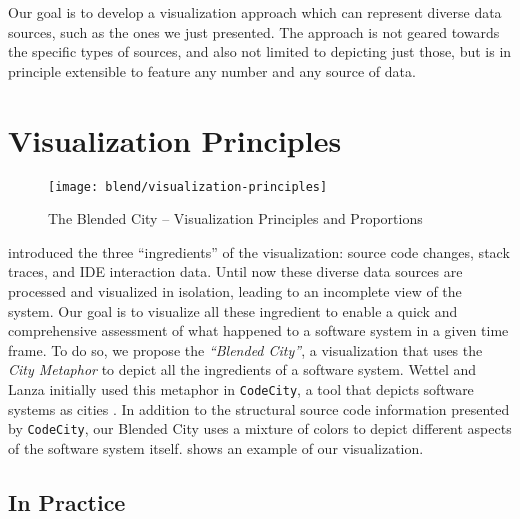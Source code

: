 Our goal is to develop a visualization approach which can represent diverse data sources, such as the ones we just presented.
The approach is not geared towards the specific types of sources, and also not limited to depicting just those, but is in principle extensible to feature any number and any source of data.



\section{Visualization Principles}\label{sec:visualization}

\begin{figure*}[ht]
\centering
\texttt{[image: blend/visualization-principles]}
\caption{The Blended City -- Visualization Principles and Proportions}
\label{fig:visualization-principles}
\end{figure*}

 introduced the three ``ingredients'' of the visualization: source code changes, stack traces, and IDE interaction data.
Until now these diverse data sources are processed and visualized in isolation, leading to an incomplete view of the system.
Our goal is to visualize all these ingredient to enable a quick and comprehensive assessment of what happened to a software system in a given time frame.
To do so, we propose the \emph{``Blended City''}, a visualization that uses the \emph{City Metaphor} to depict all the ingredients of a software system.
Wettel and Lanza initially used this metaphor in \texttt{CodeCity}, a tool that depicts software systems as cities \cite{Wett2007}.
In addition to the structural source code information presented by \texttt{CodeCity}, our Blended City uses a mixture of colors to depict different aspects of the software system itself.
 shows an example of our visualization.

\subsection{In Practice}


